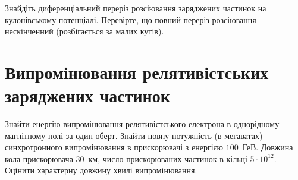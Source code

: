 \begin{problem}
Знайдіть диференціальний переріз розсіювання заряджених частинок на кулонівському потенціалі. Перевірте, що повний переріз розсіювання нескінченний (розбігається за малих кутів).
\end{problem}

\section{Випромінювання релятивістських заряджених частинок}

\begin{problem}%
Знайти енергію випромінювання релятивістського електрона в однорідному магнітному полі за один оберт. Знайти повну потужність (в мегаватах) синхротронного випромінювання в прискорювачі з енергією $100$~ГеВ. Довжина кола прискорювача $30$~км, число прискорюваних частинок в кільці $5\cdot 10^{12}$. Оцінити характерну довжину хвилі випромінювання.
\end{problem}




